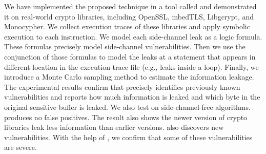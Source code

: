 We have implemented the proposed technique in a tool called \tool{} and demonstrated
it on real-world crypto libraries, including OpenSSL,
mbedTLS, Libgcrypt, and Monocypher.
We collect execution traces of these libraries and apply
symbolic execution to each instruction. We model
each side-channel leak as a logic formula. These
formulas precisely model side-channel vulnerabilities.
Then we use the conjunction of those formulas to model the
leaks at a statement that appears in different location in
the execution trace file (e.g., leaks inside a loop).
Finally, we introduce a Monte Carlo sampling method to estimate
the information leakage.
The experimental results confirm
that \tool{} precisely identifies previously known vulnerabilities and
reports how much information is leaked and which byte in the original sensitive
buffer is leaked. We also test \tool{} on side-channel-free algorithms.
\tool{} produces no false positives.
The result also shows the newer version of crypto libraries leak less information
than earlier versions.
\tool{} also discovers new vulnerabilities. With the help of \tool{},
we confirm that some of these vulnerabilities are severe.





